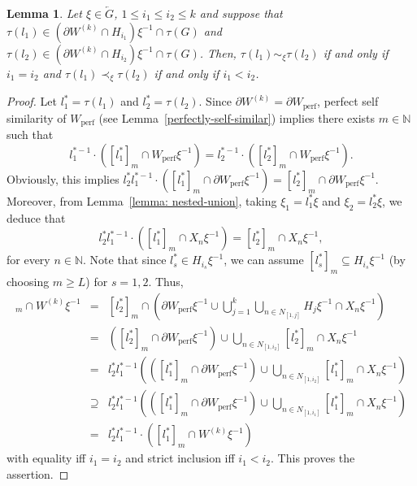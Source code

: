 \documentclass[titlepage,reqno,10pt]{amsart}
\newtheorem{lemma}[theorem]{Lemma}
\theoremstyle{definition}
\newcommand{\mt}{\supseteq}
\newcommand{\kl}{\left(}
\newcommand{\kr}{\right)}
\begin{document}
\begin{lemma}\label{self-similar-k}
    Let $\xi \in \overleftarrow{G}$, $1\leq i_1 \leq i_2 \leq k$ and suppose that $\tau(l_1)  \in (\partial W^{(k)}\cap H_{i_1})\xi^{-1}\cap \tau(G)$ and $\tau(l_2) \in (\partial W^{(k)} \cap H_{i_2})\xi^{-1} \cap \tau(G)$.
    Then, $\tau(l_1) \sim_\xi \tau(l_2)$ if and only if $i_1=i_2$ and $\tau(l_1) \prec_\xi \tau(l_2)$ if and only if $i_1<i_2$. 
\end{lemma}
\begin{proof}
Let $l_1^*=\tau(l_1)$ and $l_2^*=\tau(l_2)$. Since $\partial W^{(k)}=\partial W_{\mathrm{perf}}$, perfect self similarity of $W_{\mathrm{perf}}$ (see Lemma~\ref{perfectly-self-similar}) implies there exists $m\in \mathbb{N}$ such that
$$
l_1^{*-1}\cdot([l^*_1]_m\cap W_{\mathrm{perf}}\xi^{-1})=l_2^{*-1}\cdot ([l^*_2]_m\cap W_{\mathrm{perf}}\xi^{-1}).
$$
Obviously, this implies $l^*_2l_1^{*-1}\cdot ([l^*_1]_m \cap \partial W_{\mathrm{perf}}\xi^{-1}) = [l^*_2]_m \cap \partial W_{\mathrm{perf}} \xi^{-1}$.
Moreover, from Lemma~\ref{lemma: nested-union}, taking $\xi_1=l^*_1\xi$ and $\xi_2=l^*_2\xi$, we deduce that 
 $$l^*_2l_1^{*-1}\cdot \left([l^*_1]_m\cap X_n\xi^{-1}\right)=[l^*_2]_m\cap X_n\xi^{-1},$$ for every $n\in \mathbb{N}$.
Note that since $l^*_s\in H_{i_s}\xi^{-1}$, we can assume $[l^*_{s}]_m\subseteq H_{i_s}\xi^{-1}$ (by choosing $m\geq L$) for $s=1,2$. Thus,
\begin{eqnarray*}
[l^*_2]_m\cap W^{(k)}\xi^{-1} & = & [l^*_2]_m\cap \left( \partial W_{\mathrm{perf}}\xi^{-1} \cup \bigcup_{j=1}^k\bigcup_{n\in N_{[1,j]}} H_j\xi^{-1}\cap X_n\xi^{-1}  \right)\\
   &=& \kl [l^*_2]_m\cap \partial W_{\mathrm{perf}} \xi^{-1}\kr\cup \bigcup_{n\in N_{[1,i_2]}}[l^*_2]_m\cap X_n\xi^{-1}\\
   &=& l^*_2l_1^{*-1}\kl ([l^*_1]_m \cap \partial W_{\mathrm{perf}}\xi^{-1}) \cup \bigcup_{n\in N_{[1,i_2]}} [l^*_1]_m \cap X_n\xi^{-1}\kr\\
   &\mt&l^*_2l_1^{*-1}\kl ([l^*_1]_m \cap \partial W_{\mathrm{perf}}\xi^{-1}) \cup \bigcup_{n\in N_{[1,i_1]}} [l^*_1]_m \cap X_n\xi^{-1}\kr\\
   &=& l^*_2l_1^{*-1}\cdot\left([l^*_1]_m\cap W^{(k)}\xi^{-1} \right)
\end{eqnarray*}
 with equality iff $i_1=i_2$ and strict inclusion iff $i_1<i_2$. This proves the assertion.  
\end{proof}
\end{document}
